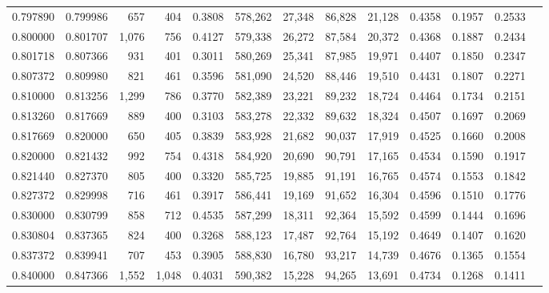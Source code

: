 \begin{tabular}{rrrrrrrrrrrrr}
0.797890 & 0.799986 &    657 &   404 &                                     0.3808 & 578,262 &  27,348 &  86,828 &  21,128 & 0.4358 & 0.1957 & 0.2533 \\
0.800000 & 0.801707 &  1,076 &   756 &                                     0.4127 & 579,338 &  26,272 &  87,584 &  20,372 & 0.4368 & 0.1887 & 0.2434 \\
0.801718 & 0.807366 &    931 &   401 &                                     0.3011 & 580,269 &  25,341 &  87,985 &  19,971 & 0.4407 & 0.1850 & 0.2347 \\
0.807372 & 0.809980 &    821 &   461 &                                     0.3596 & 581,090 &  24,520 &  88,446 &  19,510 & 0.4431 & 0.1807 & 0.2271 \\
0.810000 & 0.813256 &  1,299 &   786 &                                     0.3770 & 582,389 &  23,221 &  89,232 &  18,724 & 0.4464 & 0.1734 & 0.2151 \\
0.813260 & 0.817669 &    889 &   400 &                                     0.3103 & 583,278 &  22,332 &  89,632 &  18,324 & 0.4507 & 0.1697 & 0.2069 \\
0.817669 & 0.820000 &    650 &   405 &                                     0.3839 & 583,928 &  21,682 &  90,037 &  17,919 & 0.4525 & 0.1660 & 0.2008 \\
0.820000 & 0.821432 &    992 &   754 &                                     0.4318 & 584,920 &  20,690 &  90,791 &  17,165 & 0.4534 & 0.1590 & 0.1917 \\
0.821440 & 0.827370 &    805 &   400 &                                     0.3320 & 585,725 &  19,885 &  91,191 &  16,765 & 0.4574 & 0.1553 & 0.1842 \\
0.827372 & 0.829998 &    716 &   461 &                                     0.3917 & 586,441 &  19,169 &  91,652 &  16,304 & 0.4596 & 0.1510 & 0.1776 \\
0.830000 & 0.830799 &    858 &   712 &                                     0.4535 & 587,299 &  18,311 &  92,364 &  15,592 & 0.4599 & 0.1444 & 0.1696 \\
0.830804 & 0.837365 &    824 &   400 &                                     0.3268 & 588,123 &  17,487 &  92,764 &  15,192 & 0.4649 & 0.1407 & 0.1620 \\
0.837372 & 0.839941 &    707 &   453 &                                     0.3905 & 588,830 &  16,780 &  93,217 &  14,739 & 0.4676 & 0.1365 & 0.1554 \\
0.840000 & 0.847366 &  1,552 & 1,048 &                                     0.4031 & 590,382 &  15,228 &  94,265 &  13,691 & 0.4734 & 0.1268 & 0.1411 \\

\end{tabular}
